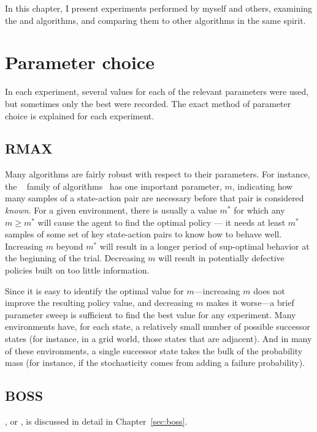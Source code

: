 In this chapter, I present experiments performed by myself and others, examining the  and  algorithms, and comparing them to other algorithms in the same spirit.

\section{Parameter choice}

In each experiment, several values for each of the relevant parameters were used, but sometimes only the best were recorded. The exact method of parameter choice is explained for each experiment.

\subsection{RMAX}

Many algorithms are fairly robust with respect to their parameters.
For instance, the ~\cite{brafman02} family of algorithms~\cite{jong07,asmuth08} has one important parameter, $m$, indicating how many samples of a state-action pair are necessary before that pair is considered \emph{known}. For a given environment, there is usually a value $m^*$ for which any $m\geq m^*$ will cause the  agent to find the optimal policy --- it needs at least $m^*$ samples of some set of key state-action pairs to know how to behave well. Increasing $m$ beyond $m^*$ will result in a longer period of sup-optimal behavior at the beginning of the trial. Decreasing $m$ will result in potentially defective policies built on too little information.

Since it is easy to identify the optimal value for $m$---increasing $m$ does not improve the resulting policy value, and decreasing $m$ makes it worse---a brief parameter sweep is sufficient to find the best value for any experiment. Many environments have, for each state, a relatively small number of possible successor states (for instance, in a grid world, those states that are adjacent). And in many of these environments, a single successor state takes the bulk of the probability mass (for instance, if the stochasticity comes from adding a failure probability).

\subsection{BOSS}

, or , is discussed in detail in Chapter~\ref{sec:boss}.


